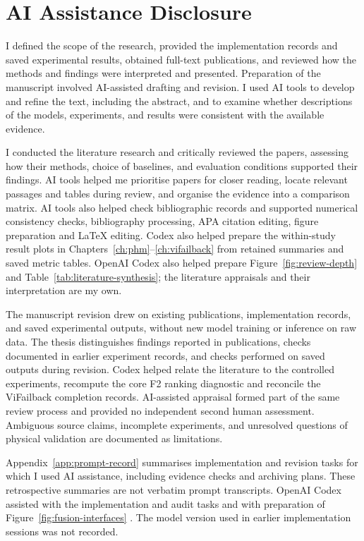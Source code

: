 \clearpage
\begingroup
\makeatletter
\renewcommand{\@makeschapterhead}[1]{%
  {\parindent=0pt\raggedright\normalfont\Huge\bfseries #1\par}%
  \nobreak\vspace{6pt}}
\makeatother
\chapter*{AI Assistance Disclosure}
\endgroup
\noindent
I defined the scope of the research, provided the implementation records and
saved experimental results, obtained full-text publications, and reviewed how the
methods and findings were interpreted and presented. Preparation of the manuscript
involved AI-assisted drafting and revision. I used AI tools to develop and
refine the text, including the abstract, and to examine whether descriptions of the
models, experiments, and results were consistent with the available evidence.

I conducted the literature research and critically reviewed the papers,
assessing how their methods, choice of baselines, and evaluation conditions supported
their findings. AI tools helped me prioritise papers for closer reading, locate
relevant passages and tables during review, and organise the evidence into a comparison
matrix. AI tools also helped check bibliographic records and supported numerical
consistency checks, bibliography processing, APA citation editing, figure preparation
and LaTeX editing. Codex also helped prepare the within-study result plots in
Chapters~\ref{ch:phm}--\ref{ch:vifailback} from retained summaries and saved metric tables.
OpenAI Codex also helped prepare Figure~\ref{fig:review-depth} and
Table~\ref{tab:literature-synthesis}; the literature appraisals and their
interpretation are my own.

The manuscript revision drew on existing publications, implementation records, and saved
experimental outputs, without new model training or inference on raw data. The thesis
distinguishes findings reported in publications, checks documented in earlier experiment
records, and checks performed on saved outputs during revision. Codex helped relate the
literature to the controlled experiments, recompute the core F2 ranking diagnostic and
reconcile the ViFailback completion records. AI-assisted appraisal formed part of the
same review process and provided no independent second human assessment. Ambiguous
source claims, incomplete experiments, and unresolved questions of physical validation
are documented as limitations.

Appendix~\ref{app:prompt-record} summarises implementation
and revision tasks for which I used AI assistance, including evidence checks and
archiving plans. These retrospective summaries are not verbatim prompt transcripts. OpenAI Codex
assisted with the implementation and audit tasks and with preparation of
Figure~\ref{fig:fusion-interfaces} \parencite{OpenAICodex}. The model version used in earlier implementation sessions was not recorded.
